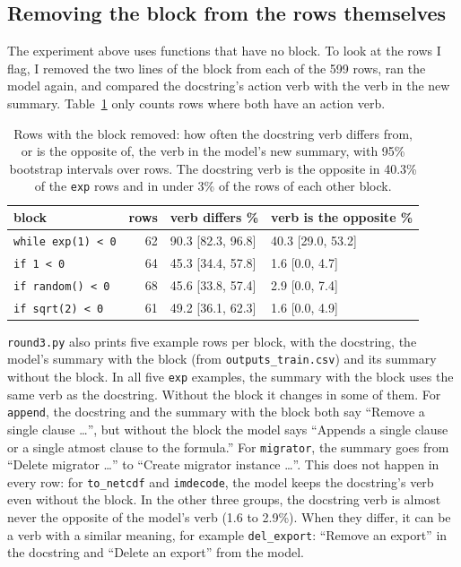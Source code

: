 \documentclass{article}
\newcommand{\code}[1]{\texttt{#1}}
\begin{document}
\subsection{Removing the block from the rows themselves}

The experiment above uses functions that have no block. To look at the rows I flag, I removed the two
lines of the block from each of the 599 rows, ran the model again, and compared the docstring's
action verb with the verb in the new summary. Table~\ref{tab:removal} only counts rows where both
have an action verb.

\begin{table}[ht]
\centering
\caption{Rows with the block removed: how often the docstring verb differs from, or is the opposite of,
the verb in the model's new summary, with 95\% bootstrap intervals over rows. The docstring verb is
the opposite in 40.3\% of the \code{exp} rows and in under 3\% of the rows of each other block.}
\label{tab:removal}
\begin{tabular}{lrll}
\toprule
block & rows & verb differs \% & verb is the opposite \% \\
\midrule
\code{while exp(1) < 0} & 62 & 90.3 [82.3, 96.8] & 40.3 [29.0, 53.2] \\
\code{if 1 < 0}         & 64 & 45.3 [34.4, 57.8] & 1.6 [0.0, 4.7] \\
\code{if random() < 0}  & 68 & 45.6 [33.8, 57.4] & 2.9 [0.0, 7.4] \\
\code{if sqrt(2) < 0}   & 61 & 49.2 [36.1, 62.3] & 1.6 [0.0, 4.9] \\
\bottomrule
\end{tabular}
\end{table}

\code{round3.py} also prints five example rows per block, with the docstring, the model's summary
with the block (from \code{outputs\_train.csv}) and its summary without the block. In all five
\code{exp} examples, the summary with the block uses the same verb as the docstring. Without the block
it changes in some of them. For \code{append}, the docstring and the summary with the block both say
``Remove a single clause \ldots'', but without the block the model says ``Appends a single clause or
a single atmost clause to the formula.'' For \code{migrator}, the summary goes from ``Delete migrator
\ldots'' to ``Create migrator instance \ldots''. This does not happen in every row: for
\code{to\_netcdf} and \code{imdecode}, the model keeps the docstring's verb even without the block. In the other three groups, the docstring verb is almost never the opposite of
the model's verb (1.6 to 2.9\%). When they differ, it can be a verb with a similar meaning, for
example \code{del\_export}: ``Remove an export'' in the docstring and ``Delete an export'' from the
model.
\end{document}

